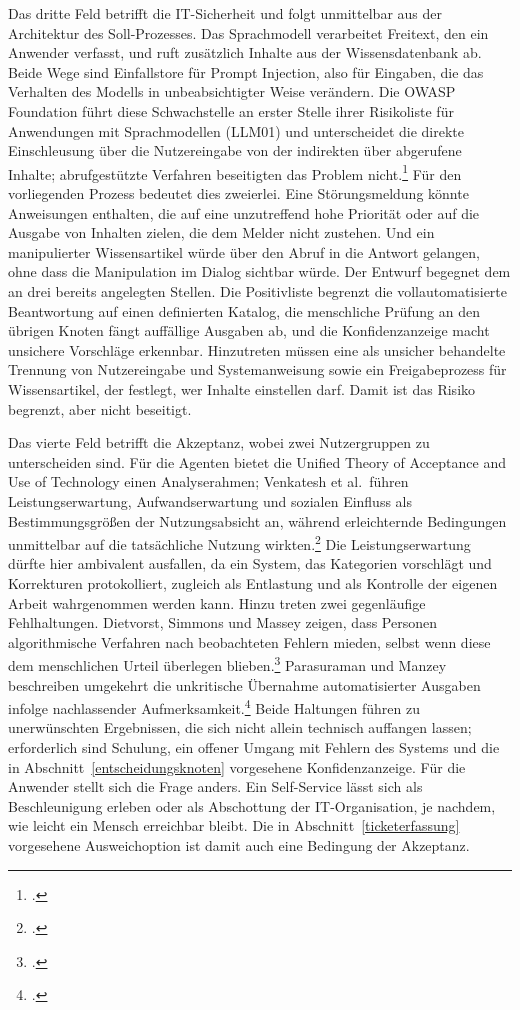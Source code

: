 Das dritte Feld betrifft die IT-Sicherheit und folgt unmittelbar aus der Architektur des Soll-Prozesses. Das Sprachmodell verarbeitet Freitext, den ein Anwender verfasst, und ruft zus\"atzlich Inhalte aus der Wissensdatenbank ab. Beide Wege sind Einfallstore f\"ur Prompt Injection, also f\"ur Eingaben, die das Verhalten des Modells in unbeabsichtigter Weise ver\"andern. Die OWASP Foundation f\"uhrt diese Schwachstelle an erster Stelle ihrer Risikoliste f\"ur Anwendungen mit Sprachmodellen (LLM01) und unterscheidet die direkte Einschleusung \"uber die Nutzereingabe von der indirekten \"uber abgerufene Inhalte; abrufgest\"utzte Verfahren beseitigten das Problem nicht.\footcite[Vgl.][o.~S.]{OWASP2025} F\"ur den vorliegenden Prozess bedeutet dies zweierlei. Eine St\"orungsmeldung k\"onnte Anweisungen enthalten, die auf eine unzutreffend hohe Priorit\"at oder auf die Ausgabe von Inhalten zielen, die dem Melder nicht zustehen. Und ein manipulierter Wissensartikel w\"urde \"uber den Abruf in die Antwort gelangen, ohne dass die Manipulation im Dialog sichtbar w\"urde. Der Entwurf begegnet dem an drei bereits angelegten Stellen. Die Positivliste begrenzt die vollautomatisierte Beantwortung auf einen definierten Katalog, die menschliche Pr\"ufung an den \"ubrigen Knoten f\"angt auff\"allige Ausgaben ab, und die Konfidenzanzeige macht unsichere Vorschl\"age erkennbar. Hinzutreten m\"ussen eine als unsicher behandelte Trennung von Nutzereingabe und Systemanweisung sowie ein Freigabeprozess f\"ur Wissensartikel, der festlegt, wer Inhalte einstellen darf. Damit ist das Risiko begrenzt, aber nicht beseitigt.

Das vierte Feld betrifft die Akzeptanz, wobei zwei Nutzergruppen zu unterscheiden sind. F\"ur die Agenten bietet die Unified Theory of Acceptance and Use of Technology einen Analyserahmen; Venkatesh et al.~f\"uhren Leistungserwartung, Aufwandserwartung und sozialen Einfluss als Bestimmungsgr\"o{\ss}en der Nutzungsabsicht an, w\"ahrend erleichternde Bedingungen unmittelbar auf die tats\"achliche Nutzung wirkten.\footcite[Vgl.][hier S.~447]{Venkatesh2003} Die Leistungserwartung d\"urfte hier ambivalent ausfallen, da ein System, das Kategorien vorschl\"agt und Korrekturen protokolliert, zugleich als Entlastung und als Kontrolle der eigenen Arbeit wahrgenommen werden kann. Hinzu treten zwei gegenl\"aufige Fehlhaltungen. Dietvorst, Simmons und Massey zeigen, dass Personen algorithmische Verfahren nach beobachteten Fehlern mieden, selbst wenn diese dem menschlichen Urteil \"uberlegen blieben.\footcite[Vgl.][hier S.~115]{Dietvorst2015} Parasuraman und Manzey beschreiben umgekehrt die unkritische \"Ubernahme automatisierter Ausgaben infolge nachlassender Aufmerksamkeit.\footcite[Vgl.][hier S.~381]{ParasuramanManzey2010} Beide Haltungen f\"uhren zu unerw\"unschten Ergebnissen, die sich nicht allein technisch auffangen lassen; erforderlich sind Schulung, ein offener Umgang mit Fehlern des Systems und die in Abschnitt~\ref{entscheidungsknoten} vorgesehene Konfidenzanzeige. F\"ur die Anwender stellt sich die Frage anders. Ein Self-Service l\"asst sich als Beschleunigung erleben oder als Abschottung der IT-Organisation, je nachdem, wie leicht ein Mensch erreichbar bleibt. Die in Abschnitt~\ref{ticketerfassung} vorgesehene Ausweichoption ist damit auch eine Bedingung der Akzeptanz.

